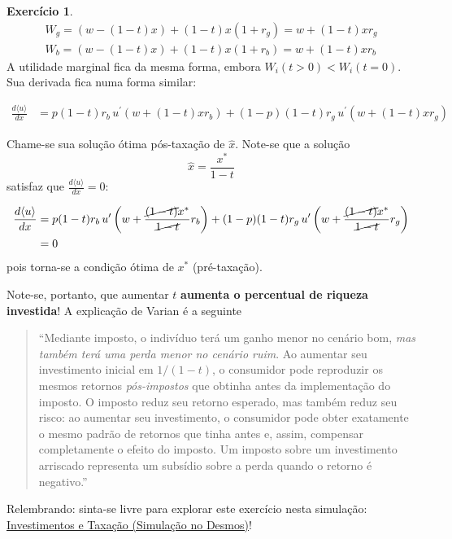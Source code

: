 \documentclass[12pt]{article}
\numberwithin{equation}{section}
\theoremstyle{plain}
\theoremstyle{definition}
\newtheorem{exercise}{Exercício}
\theoremstyle{remark}
\begin{document}
\begin{exercise}
\begin{align*}
W_{g} = (w-(1-t)x) + (1-t)x (1+r_{g}) = w + (1-t)x r_{g}\\
W_{b} = (w-(1-t)x) + (1-t)x (1+r_{b}) = w + (1-t)x r_{b}
\end{align*} A utilidade marginal fica da mesma forma, embora
\(W_{i}(t>0) < W_{i}(t=0)\). Sua derivada fica numa forma similar:

\begin{align*}
\frac{d\langle u \rangle}{dx} &= p (1-t)r_{b}\,u^\prime(w + (1-t)x r_{b}) + (1-p) (1-t)r_{g}\,u^\prime(w + (1-t)x r_{g})
\end{align*}

Chame-se sua solução ótima pós-taxação de \(\hat{x}\). Note-se que a
solução
\[
\hat{x} = \frac{x^*}{1-t}
\]
satisfaz que \(\frac{d\langle u \rangle}{dx}=0\):

\begin{align*}
\frac{d\langle u \rangle}{dx} &= p (1-t)r_{b}\,u^\prime\left( w + \frac{\cancel{ (1-t) }x^*}{\cancel{ 1-t }} r_{b} \right) + (1-p) (1-t)r_{g}\,u^\prime\left( w + \frac{\cancel{ (1-t) }x^*}{\cancel{ 1-t }} r_{g} \right) \\
&= 0
\end{align*} pois torna-se a condição ótima de \(x^*\) (pré-taxação).

Note-se, portanto, que aumentar \(t\) \textbf{aumenta o percentual de
riqueza investida}! A explicação de Varian é a seguinte

\begin{quote}
``Mediante imposto, o indivíduo terá um ganho menor no cenário bom,
\textit{mas também terá uma perda menor no cenário ruim}. Ao aumentar
seu investimento inicial em \(1/(1 - t)\), o consumidor pode reproduzir
os mesmos retornos \textit{pós-impostos} que obtinha antes da
implementação do imposto. O imposto reduz seu retorno esperado, mas
também reduz seu risco: ao aumentar seu investimento, o consumidor pode
obter exatamente o mesmo padrão de retornos que tinha antes e, assim,
compensar completamente o efeito do imposto. Um imposto sobre um
investimento arriscado representa um subsídio sobre a perda quando o
retorno é negativo.'' \parencite[, p. 235]{Varian2014}
\end{quote}

Relembrando: sinta-se livre para explorar este exercício nesta
simulação:
\href{https://www.desmos.com/calculator/ppkg28wznf}{Investimentos e
Taxação (Simulação no Desmos)}!
\end{exercise}
\end{document}
